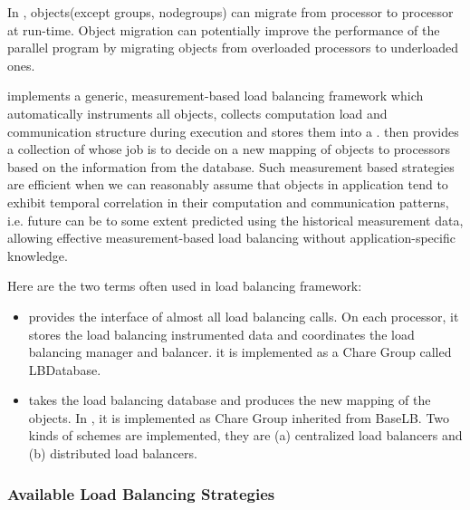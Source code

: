 In \charmpp{}, objects(except groups, nodegroups) can migrate from 
processor to processor at run-time. Object migration can potentially 
improve the performance of the parallel program by migrating objects from 
overloaded processors to underloaded ones. 


 \charmpp{} implements a generic, measurement-based load balancing framework 
which automatically instruments all \charmpp{} objects, collects computation 
load and communication structure during execution and stores them into a 
. \charmpp{} then provides a collection of 
 whose job is to decide on a new mapping of 
objects to processors based on the information from the database.
Such measurement based strategies are efficient when
we can reasonably assume that objects
in \charmpp{} application tend to exhibit temporal correlation in
their computation and communication patterns, i.e. future can be to some
extent predicted using the historical measurement data, allowing effective
measurement-based load balancing without application-specific knowledge.

Here are the two terms often used in \charmpp{} load balancing framework:
\begin{itemize}
\item {} provides the interface of almost all
   load balancing calls. On each processor, it stores the load
   balancing instrumented data and coordinates the load balancing manager and
   balancer. it is implemented as a Chare Group called {\kw LBDatabase}.
\item {} takes the load balancing database
   and produces the new mapping of the objects. In \charmpp{}, it is
   implemented as Chare Group inherited from BaseLB. Two kinds of schemes are
   implemented, they are (a) centralized load balancers and (b)
   distributed load balancers.
\end{itemize}

\subsubsection{Available Load Balancing Strategies}
\label{lbStrategy}

